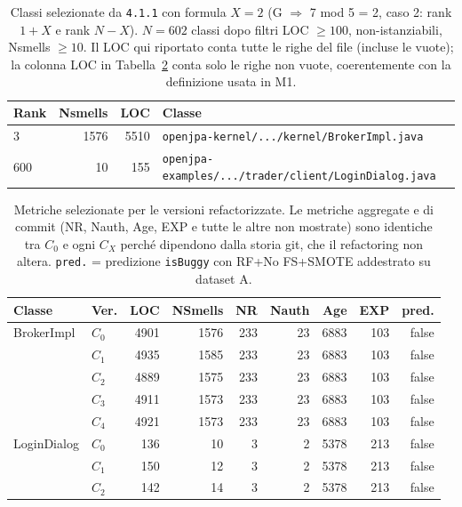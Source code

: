 \begin{table}[h!]
\centering
\small
\begin{tabular}{@{}lrrl@{}}
\toprule
\textbf{Rank} & \textbf{Nsmells} & \textbf{LOC} & \textbf{Classe} \\
\midrule
3   & 1576 & 5510 & \texttt{openjpa-kernel/.../kernel/BrokerImpl.java} \\
600 & 10   & 155  & \texttt{openjpa-examples/.../trader/client/LoginDialog.java} \\
\bottomrule
\end{tabular}
\caption{Classi selezionate da \texttt{4.1.1} con formula $X=2$
         (G $\Rightarrow$ 7 mod 5 = 2, caso 2: rank $1{+}X$ e rank $N{-}X$).
         $N = 602$ classi dopo filtri LOC $\geq 100$, non-istanziabili, Nsmells $\geq 10$.
         Il LOC qui riportato conta tutte le righe del file (incluse le vuote);
         la colonna LOC in Tabella~\ref{tab:m4-metrics} conta solo le righe non vuote,
         coerentemente con la definizione usata in M1.}
\label{tab:m4-selected}
\end{table}

\begin{table}[h!]
\centering\small
\begin{tabular}{@{}llrrrrrrr@{}}
\toprule
\textbf{Classe} & \textbf{Ver.} & \textbf{LOC} & \textbf{NSmells} & \textbf{NR} & \textbf{Nauth} & \textbf{Age} & \textbf{EXP} & \textbf{pred.} \\
\midrule
BrokerImpl & $C_0$ & 4901 & 1576 & 233 & 23 & 6883 & 103 & false \\
           & $C_1$ & 4935 & 1585 & 233 & 23 & 6883 & 103 & false \\
           & $C_2$ & 4889 & 1575 & 233 & 23 & 6883 & 103 & false \\
           & $C_3$ & 4911 & 1573 & 233 & 23 & 6883 & 103 & false \\
           & $C_4$ & 4921 & 1573 & 233 & 23 & 6883 & 103 & false \\
\addlinespace
LoginDialog & $C_0$ & 136 & 10 & 3 & 2 & 5378 & 213 & false \\
            & $C_1$ & 150 & 12 & 3 & 2 & 5378 & 213 & false \\
            & $C_2$ & 142 & 14 & 3 & 2 & 5378 & 213 & false \\
\bottomrule
\end{tabular}
\caption{Metriche selezionate per le versioni refactorizzate. Le metriche aggregate e di commit
(NR, Nauth, Age, EXP e tutte le altre non mostrate) sono identiche tra $C_0$ e ogni
$C_X$ perché dipendono dalla storia git, che il refactoring non altera.
\texttt{pred.} = predizione \texttt{isBuggy} con RF+No FS+SMOTE addestrato su dataset A.}
\label{tab:m4-metrics}
\end{table}

